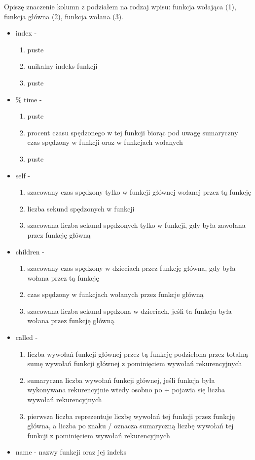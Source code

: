 \documentclass[shortabstract]{iithesis}
\theoremstyle{definition} \newtheorem*{definition}{Definicja}
\theoremstyle{definition} \newtheorem*{example}{Przykład}
\theoremstyle{definition} \newtheorem*{remark}{Uwaga}
\begin{document}
Opiszę znaczenie kolumn z podziałem na rodzaj wpisu: funkcja wołająca (1), funkcja główna (2), funkcja wołana (3). 

\begin{itemize}
    \item index - 
    \begin{enumerate}
        \item puste
        \item unikalny indeks funkcji
        \item puste
    \end{enumerate}
    
    \item \% time - 
    \begin{enumerate}
        \item puste
        \item procent czasu spędzonego w tej funkcji biorąc pod uwagę sumaryczny czas spędzony w funkcji oraz w funkcjach wołanych
        \item puste
    \end{enumerate}
    \item self -
    \begin{enumerate}
        \item szacowany czas spędzony tylko w funkcji głównej wołanej przez tą funkcję
        \item liczba sekund spędzonych w funkcji 
        \item szacowana liczba sekund spędzonych tylko w funkcji, gdy była zawołana przez funkcję główną
    \end{enumerate}
    \item children -
    \begin{enumerate}
        \item szacowany czas spędzony w dzieciach przez funkcję główna, gdy była wołana przez tą funkcję
        \item czas spędzony w funkcjach wołanych przez funkcje główną
        \item szacowana liczba sekund spędzona w dzieciach, jeśli ta funkcja była wołana przez funkcję główną
    \end{enumerate}
    \item called - 
    \begin{enumerate}
        \item liczba wywołań funkcji głównej przez tą funkcję podzielona przez totalną sumę wywołań funkcji głównej z pominięciem wywołań rekurencyjnych
        \item sumaryczna liczba wywołań funkcji głównej, jeśli funkcja była wykonywana rekurencyjnie wtedy osobno po + pojawia się liczba wywołań rekurencyjnych
        \item pierwsza liczba reprezentuje liczbę wywołań tej funkcji przez funkcję główna, a liczba po znaku / oznacza sumaryczną liczbę wywołań tej funkcji z pominięciem wywołań rekurencyjnych
    \end{enumerate}
    
    \item name - nazwy funkcji oraz jej indeks
\end{itemize}
\end{document}
